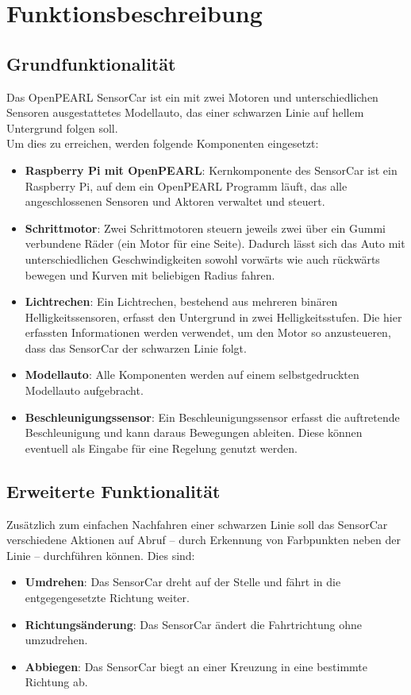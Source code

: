 \chapter{Funktionsbeschreibung}
\label{funktionsbeschreibung}
\section{Grundfunktionalität}
Das OpenPEARL SensorCar ist ein mit zwei Motoren und unterschiedlichen Sensoren ausgestattetes Modellauto, das einer schwarzen Linie auf hellem Untergrund folgen soll.\\
Um dies zu erreichen, werden folgende Komponenten eingesetzt:\\

\begin{itemize}
	\item \textbf{Raspberry Pi mit OpenPEARL}: Kernkomponente des SensorCar ist ein Raspberry Pi, auf dem ein OpenPEARL Programm läuft, das alle angeschlossenen Sensoren und Aktoren verwaltet und steuert.
	\item \textbf{Schrittmotor}: Zwei Schrittmotoren steuern jeweils zwei über ein Gummi verbundene Räder (ein Motor für eine Seite). Dadurch lässt sich das Auto mit unterschiedlichen Geschwindigkeiten sowohl vorwärts wie auch rückwärts bewegen und Kurven mit beliebigen Radius fahren.
	\item \textbf{Lichtrechen}: Ein Lichtrechen, bestehend aus mehreren binären Helligkeitssensoren, erfasst den Untergrund in zwei Helligkeitsstufen. Die hier erfassten Informationen werden verwendet, um den Motor so anzusteueren, dass das SensorCar der schwarzen Linie folgt.
	\item \textbf{Modellauto}: Alle Komponenten werden auf einem selbstgedruckten Modellauto aufgebracht.
	\item \textbf{Beschleunigungssensor}: Ein Beschleunigungssensor erfasst die auftretende Beschleunigung und kann daraus Bewegungen ableiten. Diese können eventuell als Eingabe für eine Regelung genutzt werden.
\end{itemize}

\section{Erweiterte Funktionalität}
Zusätzlich zum einfachen Nachfahren einer schwarzen Linie soll das SensorCar verschiedene Aktionen auf Abruf -- durch Erkennung von Farbpunkten neben der Linie -- durchführen können. Dies sind:
\begin{itemize}
	\item \textbf{Umdrehen}: Das SensorCar dreht auf der Stelle und fährt in die entgegengesetzte Richtung weiter.
	\item \textbf{Richtungsänderung}: Das SensorCar ändert die Fahrtrichtung ohne umzudrehen.
	\item \textbf{Abbiegen}: Das SensorCar biegt an einer Kreuzung in eine bestimmte Richtung ab.
\end{itemize}

